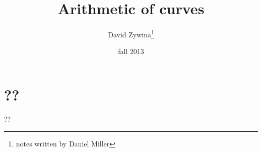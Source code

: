 \documentclass{article}
\title{Arithmetic of curves}
\author{David Zywina\thanks{notes written by Daniel Miller}}
\date{fall 2013}
\theoremstyle{definition}
\begin{document}
\maketitle










\section{??}

??
\end{document}
